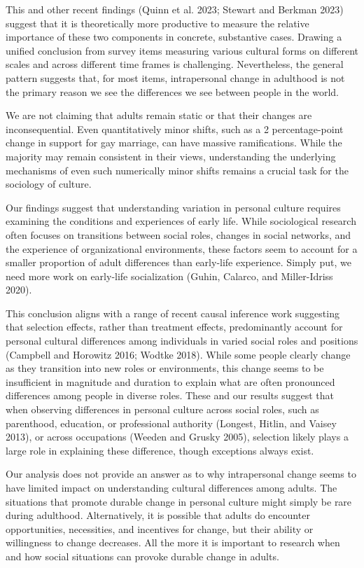 \documentclass[
  12pt,
]{article}
\begin{document}
This and other recent findings (Quinn et al. 2023; Stewart and Berkman
2023) suggest that it is theoretically more productive to measure the
relative importance of these two components in concrete, substantive
cases. Drawing a unified conclusion from survey items measuring various
cultural forms on different scales and across different time frames is
challenging. Nevertheless, the general pattern suggests that, for most
items, intrapersonal change in adulthood is not the primary reason we
see the differences we see between people in the world.

We are not claiming that adults remain static or that their changes are
inconsequential. Even quantitatively minor shifts, such as a 2
percentage-point change in support for gay marriage, can have massive
ramifications. While the majority may remain consistent in their views,
understanding the underlying mechanisms of even such numerically minor
shifts remains a crucial task for the sociology of culture.

Our findings suggest that understanding variation in personal culture
requires examining the conditions and experiences of early life. While
sociological research often focuses on transitions between social roles,
changes in social networks, and the experience of organizational
environments, these factors seem to account for a smaller proportion of
adult differences than early-life experience. Simply put, we need more
work on early-life socialization (Guhin, Calarco, and Miller-Idriss
2020).

This conclusion aligns with a range of recent causal inference work
suggesting that selection effects, rather than treatment effects,
predominantly account for personal cultural differences among
individuals in varied social roles and positions (Campbell and Horowitz
2016; Wodtke 2018). While some people clearly change as they transition
into new roles or environments, this change seems to be insufficient in
magnitude and duration to explain what are often pronounced differences
among people in diverse roles. These and our results suggest that when
observing differences in personal culture across social roles, such as
parenthood, education, or professional authority (Longest, Hitlin, and
Vaisey 2013), or across occupations (Weeden and Grusky 2005), selection
likely plays a large role in explaining these difference, though
exceptions always exist.

Our analysis does not provide an answer as to why intrapersonal change
seems to have limited impact on understanding cultural differences among
adults. The situations that promote durable change in personal culture
might simply be rare during adulthood. Alternatively, it is possible
that adults do encounter opportunities, necessities, and incentives for
change, but their ability or willingness to change decreases. All the
more it is important to research when and how social situations can
provoke durable change in adults.
\end{document}
